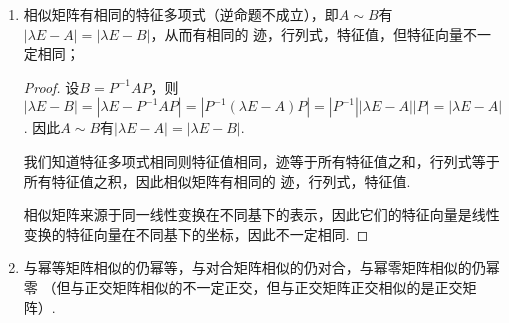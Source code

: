 \begin{enumerate}
    \begin{proof}
        设$P_1^{-1}A_1P_1=B_1$，$P_2^{-1}A_2P_2=B_2$，则
        \[ \begin{pmatrix}
            P_1 & O \\ O & P_2
        \end{pmatrix}^{-1}\begin{pmatrix}
            A_1 & O \\ O & A_2
        \end{pmatrix}\begin{pmatrix}
            P_1 & O \\ O & P_2
        \end{pmatrix}=\begin{pmatrix}
            P_1^{-1}A_1P_1 & O \\ O & P_2^{-1}A_2P_2
        \end{pmatrix}=\begin{pmatrix}
            B_1 & O \\ O & B_2
        \end{pmatrix}.\]
    \end{proof}

    \item 相似矩阵有相同的特征多项式（逆命题不成立），即$A\sim B$有$|\lambda E-A|=|\lambda E-B|$，从而有相同的
    迹，行列式，特征值，但特征向量不一定相同；

    \begin{proof}
        设$B=P^{-1}AP$，则$|\lambda E-B|=|\lambda E-P^{-1}AP|=|P^{-1}(\lambda E-A)P|=|P^{-1}||\lambda E-A||P|=|\lambda E-A|$.
        因此$A\sim B$有$|\lambda E-A|=|\lambda E-B|$.

        我们知道特征多项式相同则特征值相同，迹等于所有特征值之和，行列式等于所有特征值之积，因此相似矩阵有相同的
        迹，行列式，特征值.

        相似矩阵来源于同一线性变换在不同基下的表示，因此它们的特征向量是线性变换的特征向量在不同基下的坐标，因此不一定相同.
    \end{proof}
    \item 与幂等矩阵相似的仍幂等，与对合矩阵相似的仍对合，与幂零矩阵相似的仍幂零
    （但与正交矩阵相似的不一定正交，但与正交矩阵正交相似的是正交矩阵）.


\end{enumerate}
